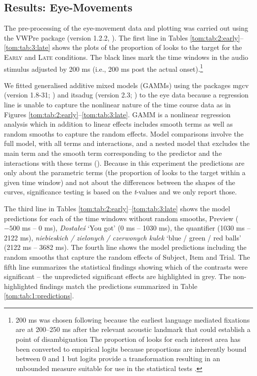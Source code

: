 \documentclass[output=paper]{langscibook}
\begin{document}

\subsection{Results: Eye-Movements} 

The pre-processing of the eye-movement data and plotting was carried out using the VWPre package (version 1.2.2,
\citealt{Porretta}). The first line in Tables \ref{tom:tab:2:early}--\ref{tom:tab:3:late} shows the plots of the proportion of looks to the target for the \textsc{Early} and \textsc{Late}
conditions. The black lines mark the time windows in the audio stimulus adjusted by 200 ms (i.e., 200 ms post the
actual onset).\footnote{\textrm{200 ms was chosen following \citet{degen2016availability} because the earliest language
mediated fixations are at 200--250 ms after the relevant acoustic landmark that could establish a point of
disambiguation \citep{salverda2014immediate}} The proportion of looks for each interest area has been
converted to empirical logits because proportions are inherently bound between 0 and 1 but logits provide a
transformation resulting in an unbounded measure suitable for use in the statistical tests \citep{barr2008analyzing}.}

We fitted generalised additive mixed models (GAMMs) using the packages mgcv (version 1.8-31; \citealt{wood2017package,wood2017generalized}) and
itsadug (version 2.3; \citealt{itsadug}) to the eye data because a regression line is unable to capture the
nonlinear nature of the time course data as in Figures \ref{tom:tab:2:early}--\ref{tom:tab:3:late}. GAMM is a nonlinear regression analysis which in addition to
linear effects includes smooth terms as well as random smooths to capture the random effects. Model comparisons involve
the full model, with all terms and interactions, and a nested model that excludes the main term and the smooth term
corresponding to the predictor and the interactions with these terms (\citealt{winter2016analyze,soskuthy2017generalised,wood2017generalized}). Because in this experiment the predictions are only about the parametric terms (the proportion of looks to the
target within a given time window) and not about the differences between the shapes of the curves, significance testing
is based on the \textit{t}{}-values and we only report those.

The third line in Tables \ref{tom:tab:2:early}--\ref{tom:tab:3:late} shows the model predictions for each of the time windows without random smooths, Preview
($-500$ ms -- 0 ms), \textit{Dostałeś} `You got' (0 ms -- 1030 ms), the quantifier (1030 ms -- 2122 ms),
\textit{niebieskich / zielonych / czerwonych kulek} `blue / green / red balls' (2122 ms -- 3682 ms). The fourth line shows the model
predictions including the random smooths that capture the random effects of Subject, Item and Trial. The fifth line
summarizes the statistical findings showing which of the contrasts were significant -- the unpredicted significant
effects are highlighted in grey. The non-highlighted findings match the predictions summarized in Table \ref{tom:tab:1:predictions}.
\end{document}
